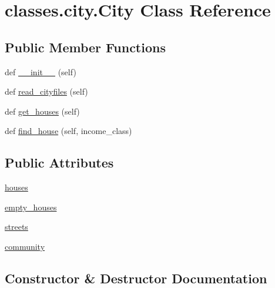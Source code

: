 \hypertarget{classclasses_1_1city_1_1City}{}\section{classes.\+city.\+City Class Reference}
\label{classclasses_1_1city_1_1City}
\subsection*{Public Member Functions}
\begin{DoxyCompactItemize}
\item 
def \hyperlink{classclasses_1_1city_1_1City_a7eba3eec9672158942ff0bc0194ea40a}{\+\_\+\+\_\+init\+\_\+\+\_\+} (self)
\item 
def \hyperlink{classclasses_1_1city_1_1City_a0d6c7b644bf837d56f6d727e99fdae88}{read\+\_\+cityfiles} (self)
\item 
def \hyperlink{classclasses_1_1city_1_1City_abe1461d21422454550dc0ac02ad59023}{get\+\_\+houses} (self)
\item 
def \hyperlink{classclasses_1_1city_1_1City_abf608991c8416bac2c5ad3404809883e}{find\+\_\+house} (self, income\+\_\+class)
\end{DoxyCompactItemize}
\subsection*{Public Attributes}
\begin{DoxyCompactItemize}
\item 
\hyperlink{classclasses_1_1city_1_1City_a51cd7e127c43663ffcab4d9d67dcace5}{houses}
\item 
\hyperlink{classclasses_1_1city_1_1City_a4271de27021e9ef2d638b11e163bc6ea}{empty\+\_\+houses}
\item 
\hyperlink{classclasses_1_1city_1_1City_a4d48dd3da02a31109eaf40614b93640d}{streets}
\item 
\hyperlink{classclasses_1_1city_1_1City_aa92227126ff6f6be70eb0e1a0ae4c927}{community}
\end{DoxyCompactItemize}


\subsection{Constructor \& Destructor Documentation}
\mbox{\label{classclasses_1_1city_1_1City_a7eba3eec9672158942ff0bc0194ea40a}} 
